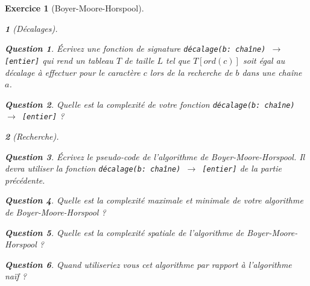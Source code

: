 \documentclass{article}
\theoremstyle{exostyle}
\newtheorem{exo}{Exercice}
\theoremstyle{partiestyle}
\newtheorem{partie}{}[exo]
\theoremstyle{questionstyle}
\newtheorem{questionpartie}{Question}[partie]
\begin{document}
\begin{exo}[Boyer-Moore-Horspool]
\begin{partie}[Décalages]
        \begin{questionpartie}
            Écrivez une fonction de signature \texttt{décalage(b: chaîne) $\rightarrow$ [entier]} qui rend un tableau $T$ de taille $L$ tel que $T[ord(c)]$ soit égal au décalage à effectuer pour le caractère $c$ lors de la recherche de $b$ dans une chaîne $a$.
        \end{questionpartie}
        \begin{questionpartie}
            Quelle est la complexité de votre fonction \texttt{décalage(b: chaîne) $\rightarrow$ [entier]} ?
        \end{questionpartie}
    \end{partie}
    \begin{partie}[Recherche]
        \begin{questionpartie}
            Écrivez le pseudo-code de l'algorithme de Boyer-Moore-Horspool. Il devra utiliser la fonction \texttt{décalage(b: chaîne) $\rightarrow$ [entier]} de la partie précédente.
        \end{questionpartie}
        \begin{questionpartie}
            Quelle est la complexité maximale et minimale de votre algorithme de Boyer-Moore-Horspool ?
        \end{questionpartie}
        \begin{questionpartie}
            Quelle est la complexité spatiale de l'algorithme de Boyer-Moore-Horspool ?
        \end{questionpartie}
        \begin{questionpartie}
                Quand utiliseriez vous cet algorithme par rapport à l'algorithme naïf ?
        \end{questionpartie}


    \end{partie}
\end{exo}
\end{document}

